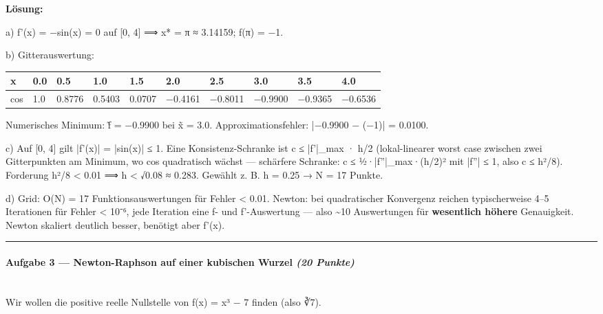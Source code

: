 \documentclass[11pt, a4paper]{article}
\begin{document}
\textbf{Lösung:}


a) f'(x) = −sin(x) = 0 auf [0, 4] ⟹ x* = π ≈ 3.14159; f(π) = −1.


b) Gitterauswertung:



\begin{landscape}

{\scriptsize
\begin{tabularx}{\linewidth}{XXXXXXXXXX}
\hline
\rowcolor{tableheadbg}
{\color{white}\textbf{x}} & {\color{white}\textbf{0.0}} & {\color{white}\textbf{0.5}} & {\color{white}\textbf{1.0}} & {\color{white}\textbf{1.5}} & {\color{white}\textbf{2.0}} & {\color{white}\textbf{2.5}} & {\color{white}\textbf{3.0}} & {\color{white}\textbf{3.5}} & {\color{white}\textbf{4.0}} \\[2pt]
\hline
\endhead
\hline
\endfoot
cos & 1.0 & 0.8776 & 0.5403 & 0.0707 & −0.4161 & −0.8011 & −0.9900 & −0.9365 & −0.6536 \\
\end{tabularx}
}
\end{landscape}


Numerisches Minimum: f̃ = −0.9900 bei x̃ = 3.0. Approximationsfehler: |−0.9900 − (−1)| = 0.0100.


c) Auf [0, 4] gilt |f'(x)| = |sin(x)| ≤ 1. Eine Konsistenz-Schranke ist c ≤ |f'|\_max · h/2 (lokal-linearer worst case zwischen zwei Gitterpunkten am Minimum, wo cos quadratisch wächst — schärfere Schranke: c ≤ ½·|f''|\_max·(h/2)² mit |f''| ≤ 1, also c ≤ h²/8). Forderung h²/8 < 0.01 ⟹ h < √0.08 ≈ 0.283. Gewählt z. B. h = 0.25 → N = 17 Punkte.


d) Grid: O(N) = 17 Funktionsauswertungen für Fehler < 0.01. Newton: bei quadratischer Konvergenz reichen typischerweise 4–5 Iterationen für Fehler < 10⁻⁶, jede Iteration eine f- und f'-Auswertung — also \textasciitilde{}10 Auswertungen für \textbf{wesentlich höhere} Genauigkeit. Newton skaliert deutlich besser, benötigt aber f'(x).



\noindent\textcolor{rulegray}{\rule{\linewidth}{0.4pt}}


\paragraph{Aufgabe 3 — Newton-Raphson auf einer kubischen Wurzel \textit{(20 Punkte)}}\mbox{}\\[2pt]

Wir wollen die positive reelle Nullstelle von f(x) = x³ − 7 finden (also ∛7).
\end{document}
